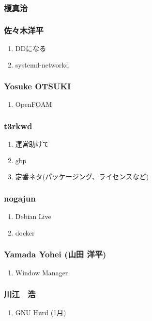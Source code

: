 \documentclass[cjk,dvipdfmx,10pt,compress,%
hyperref={bookmarks=true,bookmarksnumbered=true,bookmarksopen=false,%
colorlinks=false,%
pdftitle={第 105 回 関西 Debian 勉強会},%
pdfauthor={倉敷・のがた・佐々木・かわだ},%
pdfsubject={資料},%
}]{beamer}
\begin{document}
\begin{frame}
  \frametitle{ 榎真治 }
\end{frame}

\begin{frame}
  \frametitle{ 佐々木洋平 }
  \begin{enumerate}
  \item DDになる
  \item systemd-networkd
  \end{enumerate}
\end{frame}

\begin{frame}
  \frametitle{ Yosuke OTSUKI }
  \begin{enumerate}
  \item OpenFOAM
  \end{enumerate}
\end{frame}

\begin{frame}
  \frametitle{ t3rkwd }
  \begin{enumerate}
  \item 運営助けて
  \item gbp
  \item 定番ネタ(パッケージング、ライセンスなど)
  \end{enumerate}
\end{frame}

\begin{frame}
  \frametitle{ nogajun }
  \begin{enumerate}
  \item Debian Live
  \item docker
  \end{enumerate}
\end{frame}

\begin{frame}
  \frametitle{ Yamada Yohei (山田 洋平) }
  \begin{enumerate}
  \item Window Manager
  \end{enumerate}
\end{frame}

\begin{frame}
  \frametitle{ 川江　浩 }
  \begin{enumerate}
  \item GNU Hurd (1月)
  \end{enumerate}
\end{frame}

\end{document}
